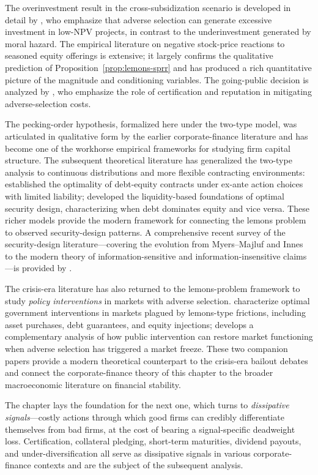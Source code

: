 \documentclass[11pt,a4paper,oneside]{book}
\theoremstyle{plain}
\theoremstyle{definition}
\theoremstyle{remark}
\numberwithin{equation}{chapter}
\begin{document}
The overinvestment result in the cross-subsidization scenario is developed in detail by \citet{DeMezaWebb1987}, who emphasize that adverse selection can generate excessive investment in low-NPV projects, in contrast to the underinvestment generated by moral hazard.
The empirical literature on negative stock-price reactions to seasoned equity offerings is extensive; it largely confirms the qualitative prediction of Proposition~\ref{prop:lemons-sprr} and has produced a rich quantitative picture of the magnitude and conditioning variables.
The going-public decision is analyzed by \citet{ChemmanurFulghieri1999}, who emphasize the role of certification and reputation in mitigating adverse-selection costs.

The pecking-order hypothesis, formalized here under the two-type model, was articulated in qualitative form by the earlier corporate-finance literature and has become one of the workhorse empirical frameworks for studying firm capital structure.
The subsequent theoretical literature has generalized the two-type analysis to continuous distributions and more flexible contracting environments: \citet{Innes1990} established the optimality of debt-equity contracts under ex-ante action choices with limited liability; \citet{DeMarzoDuffie1999} developed the liquidity-based foundations of optimal security design, characterizing when debt dominates equity and vice versa.
These richer models provide the modern framework for connecting the lemons problem to observed security-design patterns.
A comprehensive recent survey of the security-design literature---covering the evolution from Myers--Majluf and Innes to the modern theory of information-sensitive and information-insensitive claims---is provided by \citet{AllenBarbalau2024}.

The crisis-era literature has also returned to the lemons-problem framework to study \emph{policy interventions} in markets with adverse selection.
\citet{PhilipponSkreta2012} characterize optimal government interventions in markets plagued by lemons-type frictions, including asset purchases, debt guarantees, and equity injections; \citet{Tirole2012} develops a complementary analysis of how public intervention can restore market functioning when adverse selection has triggered a market freeze.
These two companion papers provide a modern theoretical counterpart to the crisis-era bailout debates and connect the corporate-finance theory of this chapter to the broader macroeconomic literature on financial stability.

The chapter lays the foundation for the next one, which turns to \emph{dissipative signals}---costly actions through which good firms can credibly differentiate themselves from bad firms, at the cost of bearing a signal-specific deadweight loss.
Certification, collateral pledging, short-term maturities, dividend payouts, and under-diversification all serve as dissipative signals in various corporate-finance contexts and are the subject of the subsequent analysis.
\end{document}
